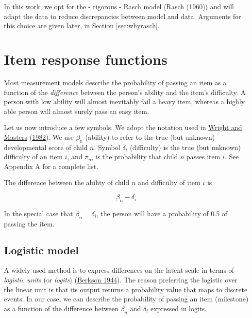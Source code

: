 \documentclass[
]{book}
\begin{document}
In this work, we opt for the - rigorous - Rasch model (\protect\hyperlink{ref-rasch1960}{Rasch} (\protect\hyperlink{ref-rasch1960}{1960})) and will adapt the data to reduce discrepancies between model and data. Arguments for this choice are given later, in Section \ref{sec:whyrasch}.

\hypertarget{sec:itemresponsefunctions}{%
\section{Item response functions}\label{sec:itemresponsefunctions}}

Most measurement models describe the probability of passing an item as a function of the \emph{difference} between the person's ability and the item's difficulty. A person with low ability will almost inevitably fail a heavy item, whereas a highly able person will almost surely pass an easy item.

Let us now introduce a few symbols. We adopt the notation used in \protect\hyperlink{ref-wright1982}{Wright and Masters} (\protect\hyperlink{ref-wright1982}{1982}). We use \(\beta_n\) (ability) to refer to the true (but unknown) developmental score of child \(n\). Symbol \(\delta_i\) (difficulty) is the true (but unknown) difficulty of an item \(i\), and \(\pi_{ni}\) is the probability that child \(n\) passes item \(i\). See Appendix A for a complete list.

The difference between the ability of child \(n\) and difficulty of item \(i\) is

\[\beta_n - \delta_i\]

In the special case that \(\beta_n = \delta_i\), the person will have a probability of 0.5 of passing the item.

\hypertarget{logistic-model}{%
\subsection{Logistic model}\label{logistic-model}}

A widely used method is to express differences on the latent scale in terms of \emph{logistic units} (or \emph{logits}) (\protect\hyperlink{ref-berkson1944}{Berkson 1944}). The reason preferring the logistic over the linear unit is that its output returns a probability value that maps to discrete events. In our case, we can describe the probability of passing an item (milestone) as a function of the difference between \(\beta_n\) and \(\delta_i\) expressed in logits.
\end{document}
